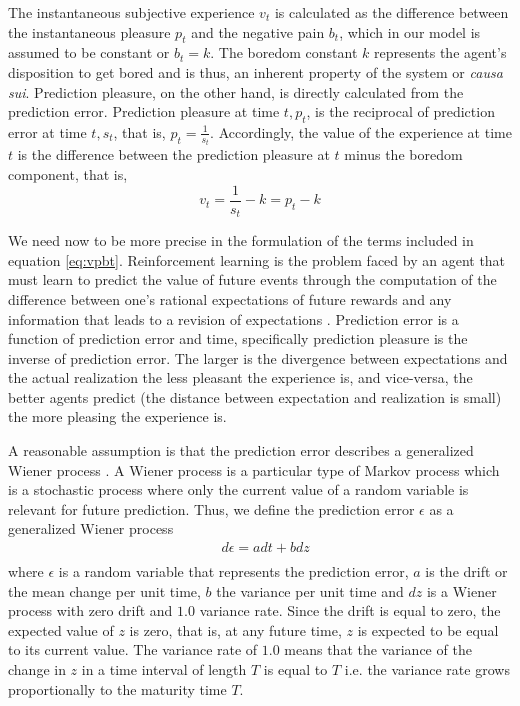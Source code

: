 \documentclass[11pt, onecolumn]{article}
\begin{document}
The instantaneous subjective experience $v_t$ is calculated as the difference between the instantaneous pleasure $p_t$ and the negative pain $b_t$, which in our model is assumed to be constant or $b_t=k$. The boredom constant $k$ represents the agent's disposition to get bored and is thus, an inherent property of the system or \emph{causa sui}. Prediction pleasure, on the other hand, is directly calculated from the prediction error.
Prediction pleasure at time $t, p_t$, is the reciprocal of prediction error at time $t, s_t$, that is, $p_t = \frac{1}{s_t}$.
Accordingly, the value of the experience at time $t$ is the difference between the prediction pleasure at $t$ minus the boredom component, that is,
\begin{equation}
    v_t = \frac{1}{s_t} -k = p_t - k
\label{eq:vpbt}
\end{equation}

We need now to be more precise in the formulation of the terms included in equation \ref{eq:vpbt}. Reinforcement learning is the problem faced by an agent that must learn to predict the value of future events through the computation of the difference between one’s rational expectations of future rewards and any information that leads to a revision of expectations \citep{glimcher_understanding_2011}. Prediction error is a function of prediction error and time, specifically prediction pleasure is the inverse of prediction error. The larger is the divergence between expectations and the actual realization the less pleasant the experience is, and vice-versa, the better agents predict (the distance between expectation and realization is small) the more pleasing the experience is.

A reasonable assumption is that the prediction error describes a generalized Wiener process \citep{ross_stochastic_1996}. A Wiener process is a particular type of Markov process which is a stochastic process where only the current value of a random variable is relevant for future prediction.  
Thus, we define the prediction error $\epsilon$ as a generalized Wiener process 
\begin{equation}
\begin{split}
& d \epsilon= a dt + b dz \\
\end{split}
\label{eq:genwiener}
\end{equation}
where $\epsilon$ is a random variable that represents the prediction error, $a$ is the drift or the mean change per unit time, $b$ the variance per unit time and $dz$ is a Wiener process with zero drift and $1.0$ variance rate. Since the drift is equal to zero, the expected value of $z$ is zero, that is, at any future time, $z$ is expected to be equal to its current value. The variance rate of $1.0$ means that the variance of the change in $z$ in a time interval of length $T$ is equal to $T$ i.e. the variance rate grows proportionally to the maturity time $T$. 
\end{document}
